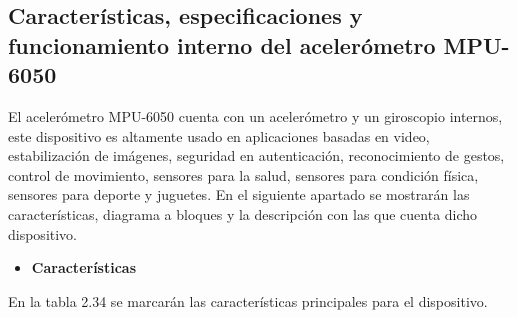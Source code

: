 \subsection{Características, especificaciones y funcionamiento interno del acelerómetro MPU-6050}

El acelerómetro MPU-6050 cuenta con un acelerómetro y un giroscopio internos, este dispositivo es altamente usado en aplicaciones basadas en video, estabilización de imágenes, seguridad en autenticación, reconocimiento de gestos, control de movimiento, sensores para la salud, sensores para condición física, sensores para deporte y juguetes. En el siguiente apartado se mostrarán las características, diagrama a bloques y la descripción con las que cuenta dicho dispositivo.

\begin{itemize}
	\item \textbf{Características}
\end{itemize}

En la tabla 2.34 se marcarán las características principales para el dispositivo. \\

